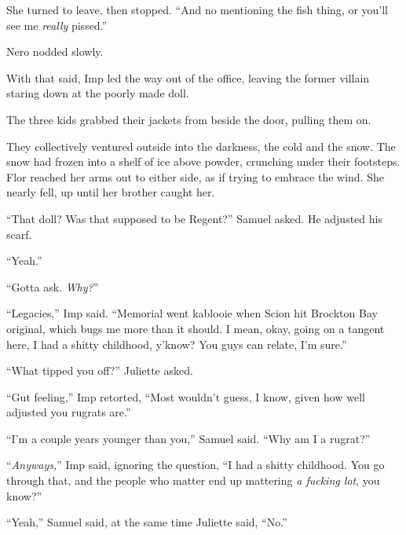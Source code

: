 She turned to leave, then stopped.  ``And no mentioning the fish thing, or you'll see me \emph{really} pissed.''



Nero nodded slowly.



With that said, Imp led the way out of the office, leaving the former villain staring down at the poorly made doll.



The three kids grabbed their jackets from beside the door, pulling them on.



They collectively ventured outside into the darkness, the cold and the snow.  The snow had frozen into a shelf of ice above powder, crunching under their footsteps.  Flor reached her arms out to either side, as if trying to embrace the wind.  She nearly fell, up until her brother caught her.



``That doll?  Was that supposed to be Regent?''  Samuel asked.  He adjusted his scarf.



``Yeah.''



``Gotta ask.  \emph{Why?}''



``Legacies,'' Imp said.  ``Memorial went kablooie when Scion hit Brockton Bay original, which bugs me more than it should.  I mean, okay, going on a tangent here, I had a shitty childhood, y'know?  You guys can relate, I'm sure.''



``What tipped you off?'' Juliette asked.



``Gut feeling,'' Imp retorted, ``Most wouldn't guess, I know, given how well adjusted you rugrats are.''



``I'm a couple years younger than you,'' Samuel said.  ``Why am I a rugrat?''



``\emph{Anyways,}'' Imp said, ignoring the question, ``I had a shitty childhood.  You go through that, and the people who matter end up mattering \emph{a fucking lot}, you know?''



``Yeah,'' Samuel said, at the same time Juliette said, ``No.''



